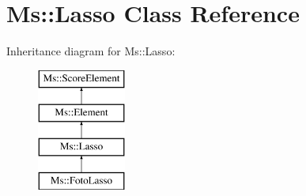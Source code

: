 \hypertarget{class_ms_1_1_lasso}{}\section{Ms\+:\+:Lasso Class Reference}
\label{class_ms_1_1_lasso}
Inheritance diagram for Ms\+:\+:Lasso\+:\begin{figure}[H]
\begin{center}
\leavevmode
\includegraphics[height=4.000000cm]{class_ms_1_1_lasso}
\end{center}
\end{figure}
